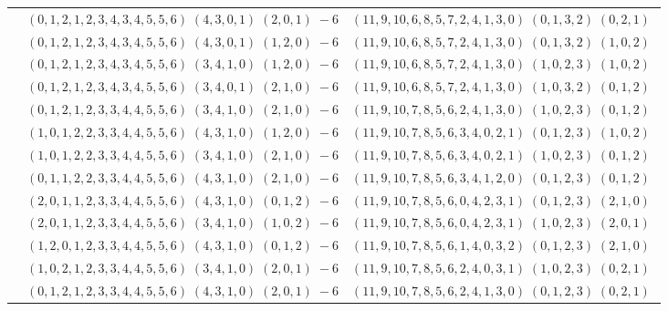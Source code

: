 \documentclass[11pt]{article}
\begin{document}
\begin{longtable}[l]{|c|c|c|}
 \cline{2-3} 
 & $(0 ,1 ,2 ,1 ,2 ,3 ,4 ,3 ,4 ,5 ,5 ,6) \;(4 ,3 ,0 ,1) \;(2 ,0 ,1) \;-6$ & $(11 ,9 ,10 ,6 ,8 ,5 ,7 ,2 ,4 ,1 ,3 ,0) \;(0 ,1 ,3 ,2) \;(0 ,2 ,1) \;$\\ 
 \cline{2-3} 
 & $(0 ,1 ,2 ,1 ,2 ,3 ,4 ,3 ,4 ,5 ,5 ,6) \;(4 ,3 ,0 ,1) \;(1 ,2 ,0) \;-6$ & $(11 ,9 ,10 ,6 ,8 ,5 ,7 ,2 ,4 ,1 ,3 ,0) \;(0 ,1 ,3 ,2) \;(1 ,0 ,2) \;$\\ 
 \cline{2-3} 
 & $(0 ,1 ,2 ,1 ,2 ,3 ,4 ,3 ,4 ,5 ,5 ,6) \;(3 ,4 ,1 ,0) \;(1 ,2 ,0) \;-6$ & $(11 ,9 ,10 ,6 ,8 ,5 ,7 ,2 ,4 ,1 ,3 ,0) \;(1 ,0 ,2 ,3) \;(1 ,0 ,2) \;$\\ 
 \cline{2-3} 
 & $(0 ,1 ,2 ,1 ,2 ,3 ,4 ,3 ,4 ,5 ,5 ,6) \;(3 ,4 ,0 ,1) \;(2 ,1 ,0) \;-6$ & $(11 ,9 ,10 ,6 ,8 ,5 ,7 ,2 ,4 ,1 ,3 ,0) \;(1 ,0 ,3 ,2) \;(0 ,1 ,2) \;$\\ 
 \cline{2-3} 
 & $(0 ,1 ,2 ,1 ,2 ,3 ,3 ,4 ,4 ,5 ,5 ,6) \;(3 ,4 ,1 ,0) \;(2 ,1 ,0) \;-6$ & $(11 ,9 ,10 ,7 ,8 ,5 ,6 ,2 ,4 ,1 ,3 ,0) \;(1 ,0 ,2 ,3) \;(0 ,1 ,2) \;$\\ 
 \cline{2-3} 
 & $(1 ,0 ,1 ,2 ,2 ,3 ,3 ,4 ,4 ,5 ,5 ,6) \;(4 ,3 ,1 ,0) \;(1 ,2 ,0) \;-6$ & $(11 ,9 ,10 ,7 ,8 ,5 ,6 ,3 ,4 ,0 ,2 ,1) \;(0 ,1 ,2 ,3) \;(1 ,0 ,2) \;$\\ 
 \cline{2-3} 
 & $(1 ,0 ,1 ,2 ,2 ,3 ,3 ,4 ,4 ,5 ,5 ,6) \;(3 ,4 ,1 ,0) \;(2 ,1 ,0) \;-6$ & $(11 ,9 ,10 ,7 ,8 ,5 ,6 ,3 ,4 ,0 ,2 ,1) \;(1 ,0 ,2 ,3) \;(0 ,1 ,2) \;$\\ 
 \cline{2-3} 
 & $(0 ,1 ,1 ,2 ,2 ,3 ,3 ,4 ,4 ,5 ,5 ,6) \;(4 ,3 ,1 ,0) \;(2 ,1 ,0) \;-6$ & $(11 ,9 ,10 ,7 ,8 ,5 ,6 ,3 ,4 ,1 ,2 ,0) \;(0 ,1 ,2 ,3) \;(0 ,1 ,2) \;$\\ 
 \cline{2-3} 
 & $(2 ,0 ,1 ,1 ,2 ,3 ,3 ,4 ,4 ,5 ,5 ,6) \;(4 ,3 ,1 ,0) \;(0 ,1 ,2) \;-6$ & $(11 ,9 ,10 ,7 ,8 ,5 ,6 ,0 ,4 ,2 ,3 ,1) \;(0 ,1 ,2 ,3) \;(2 ,1 ,0) \;$\\ 
 \cline{2-3} 
 & $(2 ,0 ,1 ,1 ,2 ,3 ,3 ,4 ,4 ,5 ,5 ,6) \;(3 ,4 ,1 ,0) \;(1 ,0 ,2) \;-6$ & $(11 ,9 ,10 ,7 ,8 ,5 ,6 ,0 ,4 ,2 ,3 ,1) \;(1 ,0 ,2 ,3) \;(2 ,0 ,1) \;$\\ 
 \cline{2-3} 
 & $(1 ,2 ,0 ,1 ,2 ,3 ,3 ,4 ,4 ,5 ,5 ,6) \;(4 ,3 ,1 ,0) \;(0 ,1 ,2) \;-6$ & $(11 ,9 ,10 ,7 ,8 ,5 ,6 ,1 ,4 ,0 ,3 ,2) \;(0 ,1 ,2 ,3) \;(2 ,1 ,0) \;$\\ 
 \cline{2-3} 
 & $(1 ,0 ,2 ,1 ,2 ,3 ,3 ,4 ,4 ,5 ,5 ,6) \;(3 ,4 ,1 ,0) \;(2 ,0 ,1) \;-6$ & $(11 ,9 ,10 ,7 ,8 ,5 ,6 ,2 ,4 ,0 ,3 ,1) \;(1 ,0 ,2 ,3) \;(0 ,2 ,1) \;$\\ 
 \cline{2-3} 
 & $(0 ,1 ,2 ,1 ,2 ,3 ,3 ,4 ,4 ,5 ,5 ,6) \;(4 ,3 ,1 ,0) \;(2 ,0 ,1) \;-6$ & $(11 ,9 ,10 ,7 ,8 ,5 ,6 ,2 ,4 ,1 ,3 ,0) \;(0 ,1 ,2 ,3) \;(0 ,2 ,1) \;$\\ 

\end{longtable}
\end{document}

